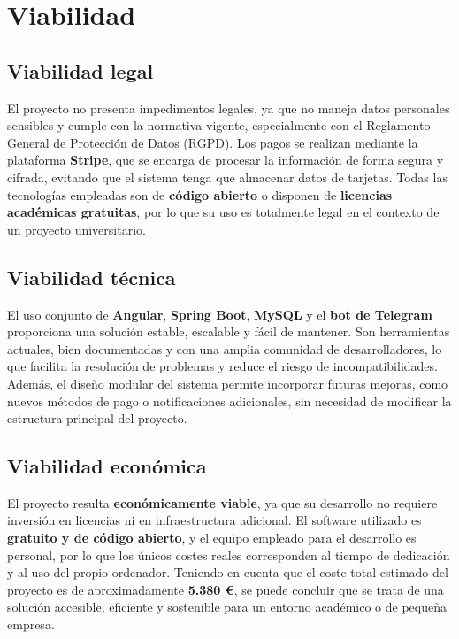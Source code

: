 \section{Viabilidad}

\subsection{Viabilidad legal}

El proyecto no presenta impedimentos legales, ya que no maneja datos personales sensibles y cumple con la normativa vigente, especialmente con el Reglamento General de Protección de Datos (RGPD). 
Los pagos se realizan mediante la plataforma \textbf{Stripe}, que se encarga de procesar la información de forma segura y cifrada, evitando que el sistema tenga que almacenar datos de tarjetas. 
Todas las tecnologías empleadas son de \textbf{código abierto} o disponen de \textbf{licencias académicas gratuitas}, por lo que su uso es totalmente legal en el contexto de un proyecto universitario.

\subsection{Viabilidad técnica}

El uso conjunto de \textbf{Angular}, \textbf{Spring Boot}, \textbf{MySQL} y el \textbf{bot de Telegram} proporciona una solución estable, escalable y fácil de mantener.
Son herramientas actuales, bien documentadas y con una amplia comunidad de desarrolladores, lo que facilita la resolución de problemas y reduce el riesgo de incompatibilidades.
Además, el diseño modular del sistema permite incorporar futuras mejoras, como nuevos métodos de pago o notificaciones adicionales, sin necesidad de modificar la estructura principal del proyecto.

\subsection{Viabilidad económica}

El proyecto resulta \textbf{económicamente viable}, ya que su desarrollo no requiere inversión en licencias ni en infraestructura adicional. 
El software utilizado es \textbf{gratuito y de código abierto}, y el equipo empleado para el desarrollo es personal, por lo que los únicos costes reales corresponden al tiempo de dedicación y al uso del propio ordenador. 
Teniendo en cuenta que el coste total estimado del proyecto es de aproximadamente \textbf{5.380 €}, se puede concluir que se trata de una solución accesible, eficiente y sostenible para un entorno académico o de pequeña empresa.
